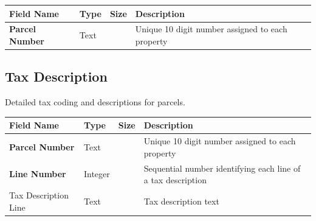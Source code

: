 \documentclass[
  english,
  letterpaper,
  DIV=11,
  numbers=noendperiod]{scrreprt}
\begin{document}
\begin{longtable}[]{@{}
  >{\raggedright\arraybackslash}p{}
  >{\raggedright\arraybackslash}p{}
  >{\raggedright\arraybackslash}p{}
  >{\raggedright\arraybackslash}p{}@{}}
\toprule\noalign{}
\begin{minipage}[b]{\linewidth}\raggedright
Field Name
\end{minipage} & \begin{minipage}[b]{\linewidth}\raggedright
Type
\end{minipage} & \begin{minipage}[b]{\linewidth}\raggedright
Size
\end{minipage} & \begin{minipage}[b]{\linewidth}\raggedright
Description
\end{minipage} \\
\midrule\noalign{}
\endhead
\bottomrule\noalign{}
\endlastfoot
\textbf{Parcel Number} & Text & 10 & Unique 10 digit number assigned to
each property \\
\end{longtable}

\subsection{Tax Description}

Detailed tax coding and descriptions for parcels.

\begin{longtable}[]{@{}
  >{\raggedright\arraybackslash}p{}
  >{\raggedright\arraybackslash}p{}
  >{\raggedright\arraybackslash}p{}
  >{\raggedright\arraybackslash}p{}@{}}
\toprule\noalign{}
\begin{minipage}[b]{\linewidth}\raggedright
Field Name
\end{minipage} & \begin{minipage}[b]{\linewidth}\raggedright
Type
\end{minipage} & \begin{minipage}[b]{\linewidth}\raggedright
Size
\end{minipage} & \begin{minipage}[b]{\linewidth}\raggedright
Description
\end{minipage} \\
\midrule\noalign{}
\endhead
\bottomrule\noalign{}
\endlastfoot
\textbf{Parcel Number} & Text & 10 & Unique 10 digit number assigned to
each property \\
\textbf{Line Number} & Integer & & Sequential number identifying each
line of a tax description \\
Tax Description Line & Text & 200 & Tax description text \\
\end{longtable}
\end{document}
